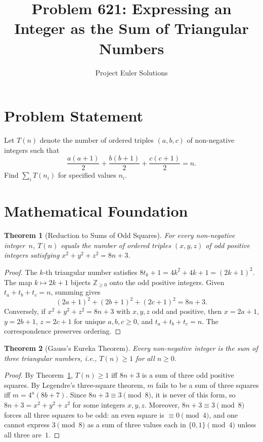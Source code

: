 \documentclass[11pt]{article}
\title{Problem 621: Expressing an Integer as the Sum of Triangular Numbers}
\author{Project Euler Solutions}
\date{}
\newtheorem{theorem}{Theorem}
\begin{document}
\maketitle

\section{Problem Statement}

Let $T(n)$ denote the number of ordered triples $(a,b,c)$ of non-negative integers such that
\[
\frac{a(a+1)}{2} + \frac{b(b+1)}{2} + \frac{c(c+1)}{2} = n.
\]
Find $\sum_i T(n_i)$ for specified values $n_i$.

\section{Mathematical Foundation}

\begin{theorem}[Reduction to Sums of Odd Squares]
\label{thm:reduction}
For every non-negative integer~$n$, $T(n)$ equals the number of ordered triples $(x,y,z)$ of odd positive integers satisfying $x^2 + y^2 + z^2 = 8n+3$.
\end{theorem}

\begin{proof}
The $k$-th triangular number satisfies $8t_k + 1 = 4k^2 + 4k + 1 = (2k+1)^2$. The map $k \mapsto 2k+1$ bijects $\mathbb{Z}_{\ge 0}$ onto the odd positive integers. Given $t_a + t_b + t_c = n$, summing gives
\[
(2a+1)^2 + (2b+1)^2 + (2c+1)^2 = 8n + 3.
\]
Conversely, if $x^2+y^2+z^2 = 8n+3$ with $x,y,z$ odd and positive, then $x=2a+1$, $y=2b+1$, $z=2c+1$ for unique $a,b,c \ge 0$, and $t_a+t_b+t_c = n$. The correspondence preserves ordering.
\end{proof}

\begin{theorem}[Gauss's Eureka Theorem]
\label{thm:gauss}
Every non-negative integer is the sum of three triangular numbers, i.e., $T(n) \ge 1$ for all $n \ge 0$.
\end{theorem}

\begin{proof}
By Theorem~\ref{thm:reduction}, $T(n) \ge 1$ iff $8n+3$ is a sum of three odd positive squares. By Legendre's three-square theorem, $m$ fails to be a sum of three squares iff $m = 4^a(8b+7)$. Since $8n+3 \equiv 3 \pmod{8}$, it is never of this form, so $8n+3 = x^2+y^2+z^2$ for some integers $x,y,z$. Moreover, $8n+3 \equiv 3 \pmod{8}$ forces all three squares to be odd: an even square is $\equiv 0 \pmod{4}$, and one cannot express $3 \pmod{8}$ as a sum of three values each in $\{0,1\} \pmod{4}$ unless all three are~$1$.
\end{proof}
\end{document}
